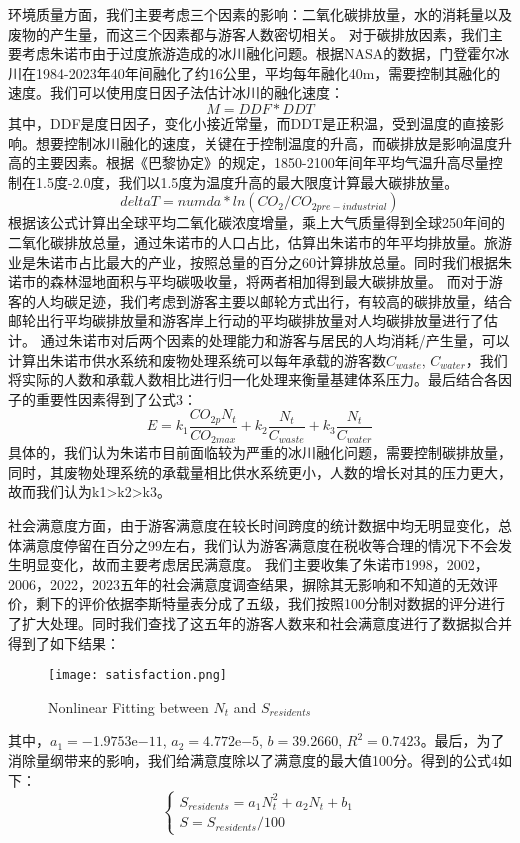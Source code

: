 \documentclass[12pt]{article}  %
\begin{document}
环境质量方面，我们主要考虑三个因素的影响：二氧化碳排放量，水的消耗量以及废物的产生量，而这三个因素都与游客人数密切相关。
对于碳排放因素，我们主要考虑朱诺市由于过度旅游造成的冰川融化问题。根据NASA的数据，门登霍尔冰川在1984-2023年40年间融化了约16公里，平均每年融化40m，需要控制其融化的速度。我们可以使用度日因子法估计冰川的融化速度：
\begin{equation}
    M=DDF*DDT
\end{equation}
其中，DDF是度日因子，变化小接近常量，而DDT是正积温，受到温度的直接影响。想要控制冰川融化的速度，关键在于控制温度的升高，而碳排放是影响温度升高的主要因素。根据《巴黎协定》的规定，1850-2100年间年平均气温升高尽量控制在1.5度-2.0度，我们以1.5度为温度升高的最大限度计算最大碳排放量。
\begin{equation}
    deltaT=numda*ln(CO_{2}/CO_{2pre-industrial})
\end{equation}
根据该公式计算出全球平均二氧化碳浓度增量，乘上大气质量得到全球250年间的二氧化碳排放总量，通过朱诺市的人口占比，估算出朱诺市的年平均排放量。旅游业是朱诺市占比最大的产业，按照总量的百分之60计算排放总量。同时我们根据朱诺市的森林湿地面积与平均碳吸收量，将两者相加得到最大碳排放量。
而对于游客的人均碳足迹，我们考虑到游客主要以邮轮方式出行，有较高的碳排放量，结合邮轮出行平均碳排放量和游客岸上行动的平均碳排放量对人均碳排放量进行了估计。
通过朱诺市对后两个因素的处理能力和游客与居民的人均消耗/产生量，可以计算出朱诺市供水系统和废物处理系统可以每年承载的游客数$C_{waste}$, $C_{water}$，我们将实际的人数和承载人数相比进行归一化处理来衡量基建体系压力。最后结合各因子的重要性因素得到了公式3：
\begin{equation}
	E=k_{1}\frac{CO_{2p}N_{t}}{CO_{2max}}+k_{2}\frac{N_{t}}{C_{waste}}+k_{3}\frac{N_{t}}{C_{water}}
\end{equation}
具体的，我们认为朱诺市目前面临较为严重的冰川融化问题，需要控制碳排放量，同时，其废物处理系统的承载量相比供水系统更小，人数的增长对其的压力更大，故而我们认为k1>k2>k3。

社会满意度方面，由于游客满意度在较长时间跨度的统计数据中均无明显变化，总体满意度停留在百分之99左右，我们认为游客满意度在税收等合理的情况下不会发生明显变化，故而主要考虑居民满意度。
我们主要收集了朱诺市1998，2002，2006，2022，2023五年的社会满意度调查结果\cite{4}，摒除其无影响和不知道的无效评价，剩下的评价依据李斯特量表分成了五级，我们按照100分制对数据的评分进行了扩大处理。同时我们查找了这五年的游客人数\cite{5}来和社会满意度进行了数据拟合并得到了如下结果：
\begin{figure}[H]
	\centering
	\texttt{[image: satisfaction.png]}
	\caption{Nonlinear Fitting between $N_t$ and $S_{residents}$}\label{fig:satisfaction}
\end{figure}
其中，$a_1 = -1.9753 \mathrm{e}{-11}$, $a_2 = 4.772\mathrm{e}{-5}$, $b = 39.2660$, $R^2 = 0.7423$。最后，为了消除量纲带来的影响，我们给满意度除以了满意度的最大值100分。得到的公式4如下：
\begin{equation}
	\begin{cases}
		S_{residents}=a_{1}N_{t}^2+a_{2}N_{t} + b_{1} \\
		S=S_{residents}/100
	\end{cases}
\end{equation}
\end{document}
